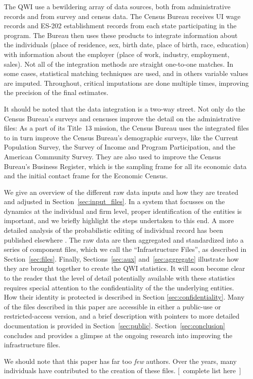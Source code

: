 The QWI use a bewildering array of data sources, both from administrative
records and from survey and census data.  The Census Bureau receives UI
wage records and ES-202 establishment records from each state participating
in the program. The Bureau then uses these products to integrate
information about the individuals (place of residence, sex, birth date,
place of birth, race, education) with information about the employer (place
of work, industry, employment, sales). Not all of the integration methods
are straight one-to-one matches. In some cases, statistical matching
techniques are used, and in others variable values are imputed. Throughout,
critical imputations are done multiple times, 
improving the precision of the final estimates. 

It should be noted that the data integration is a two-way street. Not only
do the Census Bureau's surveys and censuses improve the detail on the
administrative files: As a part of its Title~13 mission, the Census Bureau
uses the integrated files to in turn improve the Census Bureau's
demographic surveys, like the Current Population Survey, the Survey of
Income and Program Participation, and the American Community Survey. They
are also used to improve the Census Bureau's Business Register, which is
the sampling frame for all its economic data and the initial contact frame
for the Economic Census.


We  give an
overview of the different raw data inputs and how they are treated and
adjusted in Section~\ref{sec:input_files}. In a system that focusses on the
dynamics at the individual and firm level, proper identification of the
entities is important, and we briefly highlight the steps undertaken to
this end. A more detailed analysis of the probabilistic editing of
individual record has been published elsewhere \citep{AbowdVilhuber2005}. The
raw data are then aggregated and standardized into a series of component
files, which we call the ``Infrastructure Files'', as described in Section~\ref{sec:files}. Finally,
Sections~\ref{sec:aux} and~\ref{sec:aggregate} illustrate how they are brought together to
create the QWI statistics. It will soon become clear to the reader that the
level of detail potentially available with these statistics requires
special attention to the confidentiality of the the underlying entities.
How their identity is protected is described in Section
\ref{sec:confidentiality}. Many of the files described in this paper are
accessible in either a public-use or restricted-access version, and a brief
description with pointers to more detailed documentation is provided in
Section~\ref{sec:public}. Section~\ref{sec:conclusion} concludes and
provides a glimpse at the ongoing research into improving the infrastructure files.

We should note that this paper has far too {\it few} authors. Over the years,
many individuals have contributed to the creation of these files. [~complete list here~]

